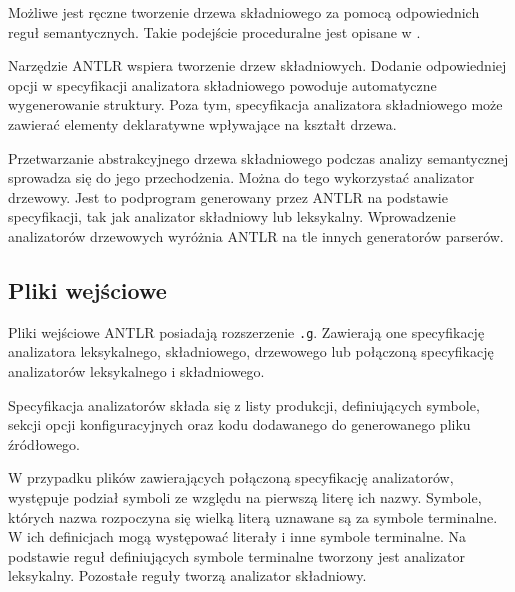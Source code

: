 
Możliwe jest ręczne tworzenie drzewa składniowego za pomocą odpowiednich
reguł semantycznych. Takie podejście proceduralne jest opisane w \cite{compilers}.

Narzędzie ANTLR wspiera tworzenie drzew składniowych. Dodanie
odpowiedniej opcji w specyfikacji analizatora składniowego powoduje automatyczne
wygenerowanie struktury. Poza tym, specyfikacja analizatora składniowego
 może zawierać elementy deklaratywne wpływające na kształt drzewa.


Przetwarzanie abstrakcyjnego drzewa składniowego podczas analizy semantycznej
sprowadza się do jego przechodzenia. Można do tego wykorzystać analizator drzewowy. 
Jest to podprogram generowany przez
ANTLR na podstawie specyfikacji, tak jak analizator składniowy lub leksykalny.
Wprowadzenie analizatorów drzewowych wyróżnia ANTLR na tle innych generatorów
 parserów.  

\subsection{Pliki wejściowe}

Pliki wejściowe ANTLR posiadają rozszerzenie \texttt{.g}. Zawierają one specyfikację
analizatora leksykalnego, składniowego, drzewowego lub połączoną specyfikację
analizatorów leksykalnego i składniowego. 

Specyfikacja analizatorów składa się z listy produkcji, definiujących symbole,
 sekcji opcji konfiguracyjnych oraz kodu dodawanego do generowanego
pliku źródłowego.

W przypadku plików zawierających połączoną specyfikację analizatorów, występuje
podział symboli ze względu na pierwszą literę ich nazwy.
 Symbole, których nazwa rozpoczyna się wielką literą uznawane są
za symbole terminalne. W ich definicjach mogą występować literały i inne
symbole terminalne. Na podstawie reguł definiujących symbole terminalne
tworzony jest analizator leksykalny. Pozostałe reguły tworzą analizator
składniowy.

